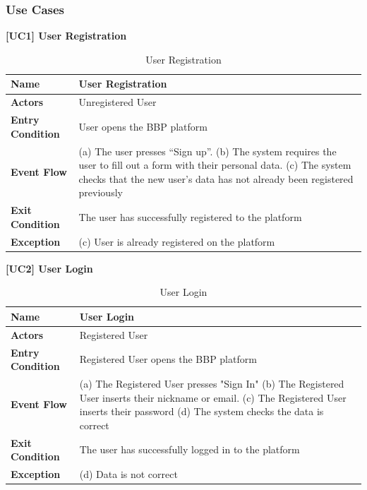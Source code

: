 \documentclass{article}
\begin{document}
\subsubsection{Use Cases}
\textbf{[UC1] User Registration}
\begin{table}[H]
    \centering
    \begin{tabularx}{\textwidth}{|l|X|}
        \hline
        \textbf{Name} & \textbf{User Registration} \\
        \hline
        \textbf{Actors} & Unregistered User \\
        \hline
        \textbf{Entry Condition} & User opens the BBP platform \\
        \hline
        \textbf{Event Flow} & 
        (a) The user presses ``Sign up''. 
        \vspace{0.2cm}
        \newline
        (b) The system requires the user to fill out a form with their personal data.  
        \vspace{0.2cm}
        \newline
        (c) The system checks that the new user's data has not already been registered previously \\
        \hline
        \textbf{Exit Condition} & The user has successfully registered to the platform \\
        \hline
        \textbf{Exception} & (c) User is already registered on the platform \\
        \hline
    \end{tabularx}
    \caption{User Registration}
\end{table}

\textbf{[UC2] User Login}
\begin{table}[H]
    \centering
    \begin{tabularx}{\textwidth}{|l|X|}
        \hline
        \textbf{Name} & \textbf{User Login} \\
        \hline
        \textbf{Actors} & Registered User \\
        \hline
        \textbf{Entry Condition} & Registered User opens the BBP platform \\
        \hline
        \textbf{Event Flow} & 
        (a) The Registered User presses "Sign In"
        \vspace{0.2cm}
        \newline
        (b) The Registered User inserts their nickname or email. 
        \vspace{0.2cm}
        \newline
        (c) The Registered User inserts their password 
        \vspace{0.2cm}
        \newline
        (d) The system checks the data is correct \\
        \hline
        \textbf{Exit Condition} & The user has successfully logged in to the platform \\
        \hline
        \textbf{Exception} & (d) Data is not correct \\
        \hline
    \end{tabularx}
    \caption{User Login}
\end{table}
\end{document}
